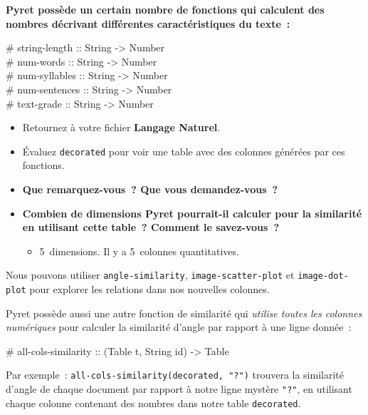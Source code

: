 \documentclass[12pt,a4paper]{article}
\newcommand{\contrat}[1]{%
  \begin{contractbox}
    \ttfamily #1
  \end{contractbox}
}
\begin{document}
\begin{keypointbox}
  \textbf{Pyret possède un certain nombre de fonctions qui calculent des nombres décrivant différentes caractéristiques du texte~:}

  \contrat{\# string-length :: String -> Number\\
\# num-words :: String -> Number\\
\# num-syllables :: String -> Number\\
\# num-sentences :: String -> Number\\
\# text-grade :: String -> Number}
\end{keypointbox}

\begin{activitybox}
  \begin{itemize}
    \item Retournez à votre fichier \textbf{Langage Naturel}.
    \item Évaluez \texttt{decorated} pour voir une table avec des colonnes générées par ces fonctions.
    \item \textbf{Que remarquez-vous~? Que vous demandez-vous~?}
  \end{itemize}
\end{activitybox}

\begin{thinkbox}
  \begin{itemize}
    \item \textbf{Combien de dimensions Pyret pourrait-il calculer pour la similarité en utilisant cette table~? Comment le savez-vous~?}
    \begin{itemize}
      \item 5~dimensions. Il y a 5~colonnes quantitatives.
    \end{itemize}
  \end{itemize}
\end{thinkbox}

\begin{keypointbox}
  Nous pouvons utiliser \texttt{angle-similarity}, \texttt{image-scatter-plot} et \texttt{image-dot-plot} pour explorer les relations dans nos nouvelles colonnes.

  Pyret possède aussi une autre fonction de similarité qui \emph{utilise toutes les colonnes numériques} pour calculer la similarité d'angle par rapport à une ligne donnée~:

  \contrat{\# all-cols-similarity :: (Table t, String id) -> Table}

  Par exemple~: \texttt{all-cols-similarity(decorated, "?")} trouvera la similarité d'angle de chaque document par rapport à notre ligne mystère \texttt{"?"}, en utilisant chaque colonne contenant des nombres dans notre table \texttt{decorated}.
\end{keypointbox}
\end{document}
